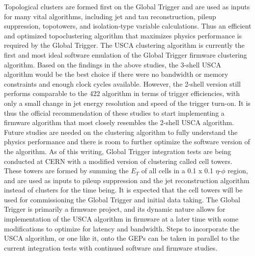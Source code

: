 Topological clusters are formed first on the Global Trigger and are used as inputs for many vital algorithms, including jet and tau reconstruction, pileup suppression, topotowers, and isolation-type variable calculations.
Thus an efficient and optimized topoclustering algorithm that maximizes physics performance is required by the Global Trigger.
The USCA clustering algorithm is currently the first and most ideal software emulation of the Global Trigger firmware clustering algorithm.
Based on the findings in the above studies, the 3-shell USCA algorithm would be the best choice if there were no bandwidth or memory constraints and enough clock cycles available. 
However, the 2-shell version still performs comparable to the 422 algorithm in terms of trigger efficiencies, with only a small change in jet energy resolution and speed of the trigger turn-on.
It is thus the official recommendation of these studies to start implementing a firmware algorithm that most closely resembles the 2-shell USCA algorithm. 
Future studies are needed on the clustering algorithm to fully understand the physics performance and there is room to further optimize the software version of the algorithm.
As of this writing, Global Trigger integration tests are being conducted at CERN with a modified version of clustering called cell towers.
These towers are formed by summing the $E_T$ of all cells in a 0.1 x 0.1 $\eta$-$\phi$ region, and are used as inputs to pileup suppression and the jet reconstruction algorithm instead of clusters for the time being.
It is expected that the cell towers will be used for commissioning the Global Trigger and initial data taking. 
The Global Trigger is primarily a firmware project, and its dynamic nature allows for implementation of the USCA algorithm in firmware at a later time with some modifications to optimize for latency and bandwidth.
Steps to incorporate the USCA algorithm, or one like it, onto the GEPs can be taken in parallel to the current integration tests with continued software and firmware studies.



% 



% 
